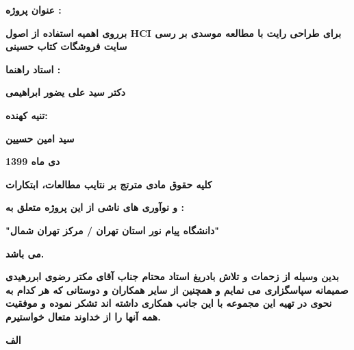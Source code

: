 \documentclass[13pt]{article}
\begin{document}
\begin{center}
\textbf{{\LARGE عنوان پروژه :}}
\end{center}

\begin{center}
{\large \textbf{برروی اهمیه استفاده از اصول HCI برای طراحی رایت با مطالعه موسدی
بر رسی سایت فروشگات کتاب حسینی} }
\end{center}

\begin{center}
\textbf{{\large استاد راهنما :}}
\end{center}

\begin{center}
\textbf{{\large دکتر سید علی یضور ابراهیمی}}
\end{center}

\begin{center}
\textbf{{\large تنیه کهنده:}}
\end{center}

\begin{center}
\textbf{{\large سید امین حسیین}}
\end{center}

\begin{center}
\textbf{{\large دی ماه 1399}}
\end{center}

\begin{center}
\textbf{کلیه حقوق مادی مترتج بر نتایب مطالعات، ابتکارات}
\end{center}

\begin{center}
\textbf{و نوآوری های ناشی از این پروژه متعلق به :}
\end{center}

\begin{center}
\textbf{"دانشگاه پیام نور استان تهران / مرکز تهران شمال"}
\end{center}

\begin{center}
\textbf{می باشد.}
\end{center}
\pagebreak{}


\textbf{بدین وسیله از زحمات و تلاش بادریغ استاد محتام جناب آقای مکتر رضوی
ابررهیدی صمیمانه سپاسگزاری می نمایم و همچنین از سایر همکاران و دوستانی که هر کدام
به نحوی در تهیه این مجموعه با این جانب همکاری داشته اند تشکر نموده و موفقیت همه
آنها را از خداوند متعال خواستیرم.}

\begin{center}
\textbf{{\large الف}}
\end{center}
\end{document}
